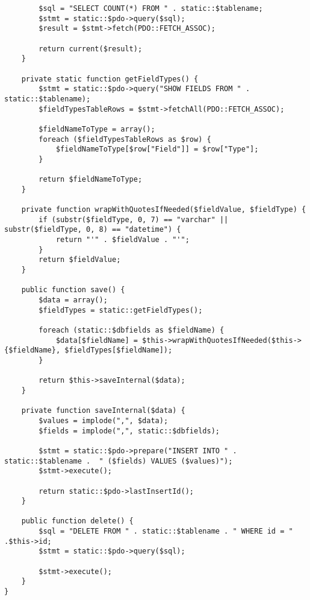 \documentclass[a4paper,14pt]{extarticle}
\begin{document}
\begin{lstlisting}
        $sql = "SELECT COUNT(*) FROM " . static::$tablename;
        $stmt = static::$pdo->query($sql);
        $result = $stmt->fetch(PDO::FETCH_ASSOC);

        return current($result);
    }

    private static function getFieldTypes() {
        $stmt = static::$pdo->query("SHOW FIELDS FROM " . static::$tablename);
        $fieldTypesTableRows = $stmt->fetchAll(PDO::FETCH_ASSOC);

        $fieldNameToType = array();
        foreach ($fieldTypesTableRows as $row) {
            $fieldNameToType[$row["Field"]] = $row["Type"];
        }

        return $fieldNameToType;
    }

    private function wrapWithQuotesIfNeeded($fieldValue, $fieldType) {
        if (substr($fieldType, 0, 7) == "varchar" || substr($fieldType, 0, 8) == "datetime") {
            return "'" . $fieldValue . "'";
        }
        return $fieldValue;
    }

    public function save() {
        $data = array();
        $fieldTypes = static::getFieldTypes();

        foreach (static::$dbfields as $fieldName) {
            $data[$fieldName] = $this->wrapWithQuotesIfNeeded($this->{$fieldName}, $fieldTypes[$fieldName]);
        }

        return $this->saveInternal($data);
    }

    private function saveInternal($data) {
        $values = implode(",", $data);
        $fields = implode(",", static::$dbfields);

        $stmt = static::$pdo->prepare("INSERT INTO " . static::$tablename .  " ($fields) VALUES ($values)");
        $stmt->execute();

        return static::$pdo->lastInsertId();
    }

    public function delete() {
        $sql = "DELETE FROM " . static::$tablename . " WHERE id = " .$this->id;
        $stmt = static::$pdo->query($sql);

        $stmt->execute();
    }
}
\end{lstlisting}
\end{document}
